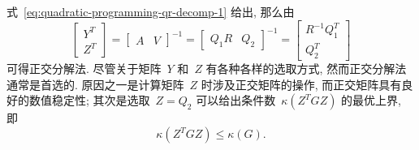 式~\eqref{eq:quadratic-programming-qr-decomp-1} 给出, 那么由
\begin{equation*}
\begin{bmatrix} Y^T \\ Z^T \end{bmatrix} = \begin{bmatrix} A & V \end{bmatrix}^{-1} = \begin{bmatrix} Q_1R & Q_2 \end{bmatrix}^{-1} = \begin{bmatrix} R^{-1} Q_1^T \\ Q_2^T \end{bmatrix}
\end{equation*}
可得正交分解法. 尽管关于矩阵~$Y$ 和~$Z$ 有各种各样的选取方式, 然而正交分解法通常是首选的. 原因之一是计算矩阵~$Z$ 时涉及正交矩阵的操作, 而正交矩阵具有良好的数值稳定性; 其次是选取~$Z = Q_2$ 可以给出条件数~$\kappa(Z^T G Z)$ 的最优上界, 即
\begin{equation*}
\kappa(Z^T G Z) \leqslant \kappa(G).
\end{equation*}

